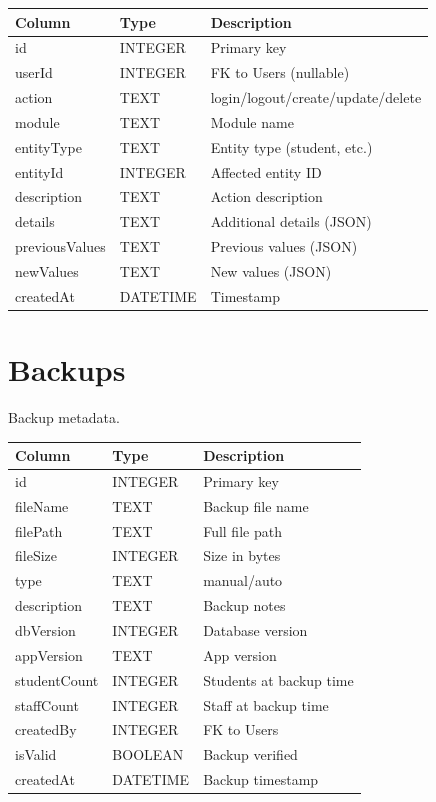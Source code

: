 \documentclass[12pt,a4paper]{report}
\begin{document}
\begin{longtable}{@{}p{4cm}p{2.5cm}p{6.5cm}@{}}
\toprule
\textbf{Column} & \textbf{Type} & \textbf{Description} \\
\midrule
\endhead
id & INTEGER & Primary key \\
userId & INTEGER & FK to Users (nullable) \\
action & TEXT & login/logout/create/update/delete \\
module & TEXT & Module name \\
entityType & TEXT & Entity type (student, etc.) \\
entityId & INTEGER & Affected entity ID \\
description & TEXT & Action description \\
details & TEXT & Additional details (JSON) \\
previousValues & TEXT & Previous values (JSON) \\
newValues & TEXT & New values (JSON) \\
createdAt & DATETIME & Timestamp \\
\bottomrule
\end{longtable}

\section{Backups}

Backup metadata.

\begin{longtable}{@{}p{4cm}p{2.5cm}p{6.5cm}@{}}
\toprule
\textbf{Column} & \textbf{Type} & \textbf{Description} \\
\midrule
\endhead
id & INTEGER & Primary key \\
fileName & TEXT & Backup file name \\
filePath & TEXT & Full file path \\
fileSize & INTEGER & Size in bytes \\
type & TEXT & manual/auto \\
description & TEXT & Backup notes \\
dbVersion & INTEGER & Database version \\
appVersion & TEXT & App version \\
studentCount & INTEGER & Students at backup time \\
staffCount & INTEGER & Staff at backup time \\
createdBy & INTEGER & FK to Users \\
isValid & BOOLEAN & Backup verified \\
createdAt & DATETIME & Backup timestamp \\
\bottomrule
\end{longtable}
\end{document}
